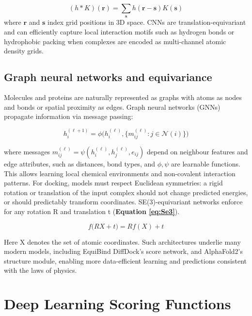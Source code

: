 \documentclass[12pt]{article}
\begin{document}
\begin{equation}
(h * K)(\mathbf{r}) = \sum_{\mathbf{s}} h(\mathbf{r} - \mathbf{s}) K(\mathbf{s})
\label{eq:PLlayer}
\end{equation}
where $\mathbf{r}$ and $\mathbf{s}$ index grid positions in 3D space. CNNs are translation-equivariant and can efficiently capture local interaction motifs such as hydrogen bonds or hydrophobic packing when complexes are encoded as multi-channel atomic density grids.

\subsection{Graph neural networks and equivariance}

Molecules and proteins are naturally represented as graphs with atoms as nodes and bonds or spatial proximity as edges. Graph neural networks (GNNs) propagate information via message passing:

\begin{equation}
h_i^{(\ell+1)} = \phi\big(h_i^{(\ell)}, \big\{ m_{ij}^{(\ell)} : j \in \mathcal{N}(i) \big\}\big)
\end{equation}

where messages $m_{ij}^{(\ell)} = \psi(h_i^{(\ell)}, h_j^{(\ell)}, e_{ij})$ depend on neighbour features and edge attributes, such as distances, bond types, and $\phi,\psi$ are learnable functions. This allows learning local chemical environments and non-covalent interaction patterns. For docking, models must respect Euclidean symmetries: a rigid rotation or translation of the input complex should not change predicted energies, or should predictably transform coordinates. SE(3)-equivariant networks enforce for any rotation R and translation t (\textbf{Equation \ref{eq:Se3}}).

\begin{equation}
f\big(R X + t\big) = R f(X) + t
\label{eq:Se3}
\end{equation}

 Here X denotes the set of atomic coordinates. Such architectures underlie many modern models, including EquiBind\cite{CH13_stark2022equibind} DiffDock’s\cite{CH13_corso2022diffdock} score network, and AlphaFold2’s\cite{CH13_jumper2021alphafold} structure module, enabling more data-efficient learning and predictions consistent with the laws of physics.

\section{Deep Learning Scoring Functions}
\end{document}
